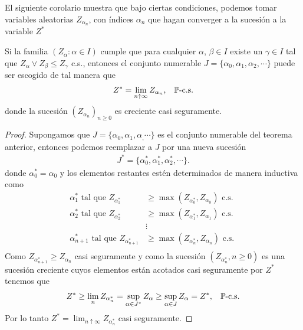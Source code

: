 El siguiente corolario muestra que bajo ciertas condiciones, podemos tomar variables aleatorias $Z_{\alpha_{n}}$, con índices $\alpha_{n}$ que hagan converger a la sucesión a la variable $Z^{*}$

\begin{corollary}
\label{coroesssup}
Si la familia $(Z_\alpha : \alpha \in I)$ cumple que para cualquier $\alpha$, $\beta \in I$ existe un $\gamma \in I$ tal que $Z_\alpha \vee Z_\beta \leq Z_\gamma$ c.s., entonces el conjunto numerable $J = \{\alpha_0, \alpha_1, \alpha_2, \cdots\}$ puede ser escogido de tal manera que
	\begin{align*}
	Z^{*} = \lim_{n \uparrow \infty} Z_{\alpha_n}, \hspace{0.3cm} \mathbb{P}\text{-c.s.}
	\end{align*}
donde la sucesión $( Z_{\alpha_n})_{n \geq 0}$ es creciente casi seguramente.
\end{corollary}
\begin{proof}
Supongamos que $J = \{\alpha_0, \alpha_1, \alpha_, \cdots\}$ es el conjunto numerable del teorema anterior, entonces podemos reemplazar a $J$ por una nueva sucesión
	\begin{align*}
	J^{*} = \{\alpha_0^{*}, \alpha_1^{*}, \alpha_2^{*}, \cdots\}.
	\end{align*}
donde $\alpha_0^{*} = \alpha_0$ y los elementos restantes estén determinados de manera inductiva como
	\begin{align*}
	\alpha_1^{*} \text{ tal que } Z_{\alpha_1^{*}} & \geq \max(Z_{\alpha_0^{*}}, Z_{\alpha_0}) \text{ c.s. } \\
	\alpha_2^{*} \text{ tal que } Z_{\alpha_2^{*}} & \geq \max(Z_{\alpha_1^{*}}, Z_{\alpha_1}) \text{ c.s. } \\
	& \vdots \\
	\alpha_{n+1}^{*} \text{ tal que } Z_{\alpha_{n+1}^{*}} & \geq \max(Z_{\alpha_n^{*}}, Z_{\alpha_n}) \text{ c.s. } \\
	\end{align*}
Como $Z_{\alpha_{n+1}^{*}} \geq Z_{\alpha_{n}}$ casi seguramente y como la sucesión $(Z_{\alpha_n^{*}}, n \geq 0)$ es una sucesión creciente cuyos elementos están acotados casi seguramente por $Z^{*}$ tenemos que
	\begin{align*}
	Z^{*} \geq \lim_n Z_{\alpha_n^{*}} = \sup_{\alpha \in J^{*}} Z_\alpha \geq \sup_{\alpha \in J} Z_\alpha = Z^{*}, \hspace{0.3cm} \mathbb{P}\text{-c.s.}
	\end{align*}
Por lo tanto $Z^{*} = \lim_{n \uparrow \infty} Z_{\alpha_n^{*}}$ casi seguramente.
\end{proof}


